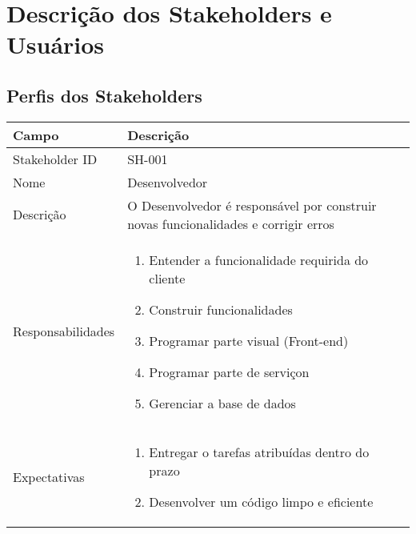 \chapter{Descrição dos Stakeholders e Usuários}

\section{Perfis dos Stakeholders}


\begin{tabularx}{\textwidth}{| l | X |}
    \hline
    Campo             & Descrição                                                                                                                                                                           \\ \hline
    
    Stakeholder ID    & SH-001                                                                                                                                                                              \\ \hline
    
    Nome              & Desenvolvedor                                                                                                                                                                       \\ \hline
    
    Descrição         & O Desenvolvedor é responsável por construir novas funcionalidades e corrigir erros
    \\ \hline
  
    Responsabilidades & 
    \begin{enumerate}
        \item Entender a funcionalidade requirida do cliente
        \item Construir funcionalidades
        \item Programar parte visual (Front-end)
        \item Programar parte de serviçon
        \item Gerenciar a base de dados
    \end{enumerate}

    \\ \hline
    Expectativas      & 
    \begin{enumerate}
        \item Entregar o tarefas atribuídas dentro do prazo
        \item Desenvolver um código limpo e eficiente
    \end{enumerate}
    

\end{tabularx}
